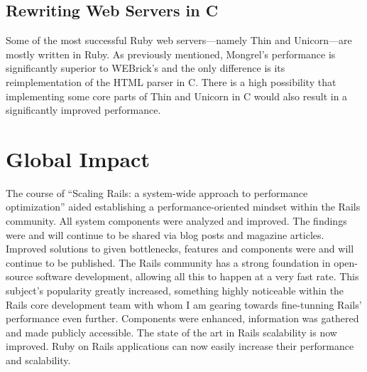\subsection{Rewriting Web Servers in C}
Some of the most successful Ruby web servers---namely Thin and Unicorn---are mostly written in Ruby. As previously mentioned, Mongrel's performance is significantly superior to WEBrick's and the only difference is its reimplementation of the HTML parser in C. There is a high possibility that implementing some core parts of Thin and Unicorn in C would also result in a significantly improved performance.

\section{Global Impact}
The course of ``Scaling Rails: a system-wide approach to performance optimization'' aided establishing a performance-oriented mindset within the Rails community. All system components were analyzed and improved. The findings were and will continue to be shared via blog posts and magazine articles. Improved solutions to given bottlenecks, features and components were and will continue to be published. The Rails community has a strong foundation in open-source software development, allowing all this to happen at a very fast rate. This subject's popularity greatly increased, something highly noticeable within the Rails core development team with whom I am gearing towards fine-tunning Rails' performance even further. Components were enhanced, information was gathered and made publicly accessible. The state of the art in Rails scalability is now improved. Ruby on Rails applications can now easily increase their performance and scalability.
